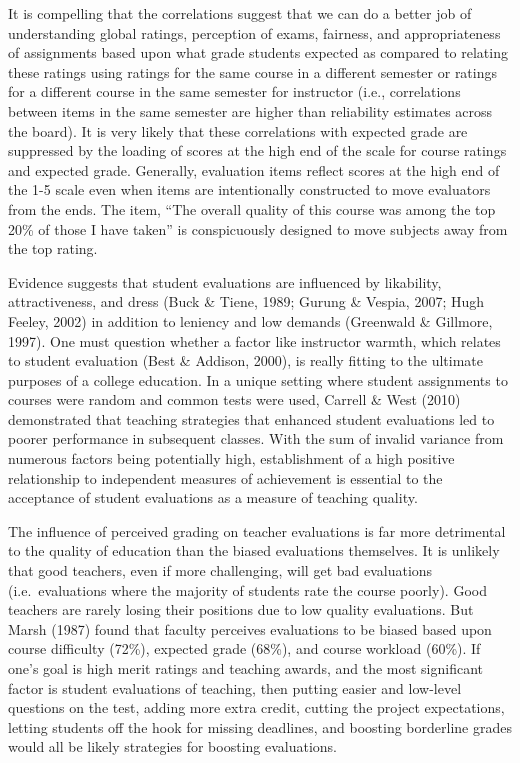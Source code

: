 \documentclass[man]{apa6}
\theoremstyle{definition}
\theoremstyle{definition}
\theoremstyle{definition}
\theoremstyle{remark}
\begin{document}
It is compelling that the correlations suggest that we can do a better
job of understanding global ratings, perception of exams, fairness, and
appropriateness of assignments based upon what grade students expected
as compared to relating these ratings using ratings for the same course
in a different semester or ratings for a different course in the same
semester for instructor (i.e., correlations between items in the same
semester are higher than reliability estimates across the board). It is
very likely that these correlations with expected grade are suppressed
by the loading of scores at the high end of the scale for course ratings
and expected grade. Generally, evaluation items reflect scores at the
high end of the 1-5 scale even when items are intentionally constructed
to move evaluators from the ends. The item, \enquote{The overall quality
of this course was among the top 20\% of those I have taken} is
conspicuously designed to move subjects away from the top rating.

Evidence suggests that student evaluations are influenced by likability,
attractiveness, and dress (Buck \& Tiene, 1989; Gurung \& Vespia, 2007;
Hugh Feeley, 2002) in addition to leniency and low demands (Greenwald \&
Gillmore, 1997). One must question whether a factor like instructor
warmth, which relates to student evaluation (Best \& Addison, 2000), is
really fitting to the ultimate purposes of a college education. In a
unique setting where student assignments to courses were random and
common tests were used, Carrell \& West (2010) demonstrated that
teaching strategies that enhanced student evaluations led to poorer
performance in subsequent classes. With the sum of invalid variance from
numerous factors being potentially high, establishment of a high
positive relationship to independent measures of achievement is
essential to the acceptance of student evaluations as a measure of
teaching quality.

The influence of perceived grading on teacher evaluations is far more
detrimental to the quality of education than the biased evaluations
themselves. It is unlikely that good teachers, even if more challenging,
will get bad evaluations (i.e.~evaluations where the majority of
students rate the course poorly). Good teachers are rarely losing their
positions due to low quality evaluations. But Marsh (1987) found that
faculty perceives evaluations to be biased based upon course difficulty
(72\%), expected grade (68\%), and course workload (60\%). If one's goal
is high merit ratings and teaching awards, and the most significant
factor is student evaluations of teaching, then putting easier and
low-level questions on the test, adding more extra credit, cutting the
project expectations, letting students off the hook for missing
deadlines, and boosting borderline grades would all be likely strategies
for boosting evaluations.
\end{document}
